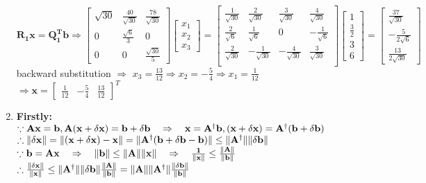 \documentclass[english,onecolumn]{IEEEtran}
\begin{document}
\begin{enumerate}
   $$
   \mathbf{R_1 x = Q_1^T b} \Rightarrow
   \begin{bmatrix}
    \sqrt{30} & \frac{40}{\sqrt{30}} & \frac{78}{\sqrt{30}}\\
    0 & \frac{\sqrt{6}}{3} & 0\\
    0 & 0 & \frac{\sqrt{30}}{5}
    \end{bmatrix}
    \begin{bmatrix}
    x_1 \\ x_2 \\ x_3
    \end{bmatrix} = 
    \begin{bmatrix}
    \frac{1}{\sqrt{30}} & \frac{2}{\sqrt{30}}  &  \frac{3}{\sqrt{30}} & \frac{4}{\sqrt{30}}  \\
    \frac{2}{\sqrt{6}} & \frac{1}{\sqrt{6}}  & 0  & -\frac{1}{\sqrt{6}}  \\
    \frac{2}{\sqrt{30}} & -\frac{1}{\sqrt{30}}  & -\frac{4}{\sqrt{30}}  & \frac{3}{\sqrt{30}}  \\
    \end{bmatrix}
    \begin{bmatrix}
    1 \\ \frac{3}{2} \\ 3 \\ 6
    \end{bmatrix} = 
    \begin{bmatrix}
    \frac{37}{\sqrt{30}} \\ -\frac{5}{2\sqrt{6}} \\ \frac{13}{2\sqrt{30}}
    \end{bmatrix}
   $$
   backward substitution $\Rightarrow$ 
   $x_3 = \frac{13}{12} \Rightarrow x_2 = -\frac{5}{4} \Rightarrow x_1 = \frac{1}{12} $
   $\Rightarrow \mathbf{x} =
    \begin{bmatrix}
    \frac{1}{12} & -\frac{5}{4} & \frac{13}{12}
    \end{bmatrix}^T
   $
    
    \item
    
    {\bf Firstly:}\\
    $\because \bf A x = b, A(x + \delta x)  = b + \delta b \quad \Rightarrow \quad x = A^{\dagger} b, (x + \delta x) = A^{\dagger}(b + \delta b)$\\
    $\therefore \bf \|\delta x \| = \| (x + \delta x) - x \| = \| A^{\dagger} (b + \delta b - b) \| \le \|A^{\dagger}\| \| \delta b \|      $\\
    $\because \bf b = A x \quad \Rightarrow \quad \|b\| \le \|A\| \|x \| \quad \Rightarrow \quad \frac{1}{\|x\|} \le \frac{\|A\|}{\|b\|} $\\
    $\therefore \bf \frac{\|\delta x \|}{\|x\|} \le \|A^{\dagger}\| \| \delta b \| \frac{\|A\|}{\|b\|} = \|A\| \|A^{\dagger} \| \frac{\| \delta b \|}{\|b\|}$
    

\end{enumerate}
\end{document}

